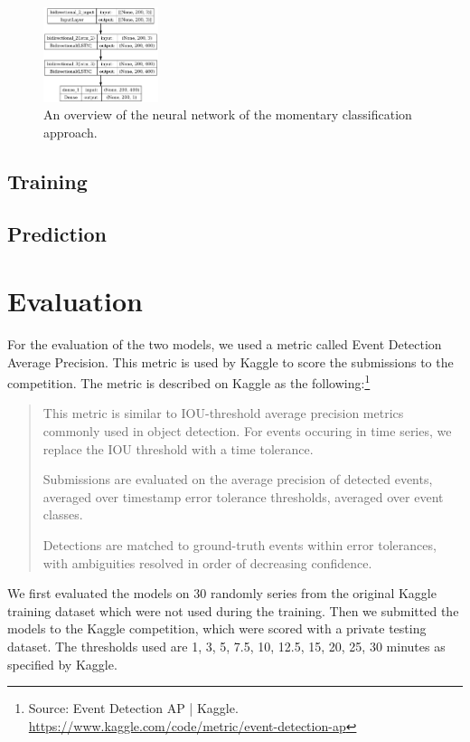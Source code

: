\documentclass{article}
\begin{document}
\begin{figure}
    \label{fig:model-lstm}
    \centering
    \includegraphics[width=0.3\textwidth]{model_plot-2.png}
    \caption{An overview of the neural network of the momentary classification approach.}
\end{figure}

\subsection{Training}

\subsection{Prediction}

\section{Evaluation}

For the evaluation of the two models, we used a metric called Event Detection Average Precision. This metric is used by Kaggle to score the submissions to the competition. The metric is described on Kaggle as the following:\footnote{Source: Event Detection AP | Kaggle. \url{https://www.kaggle.com/code/metric/event-detection-ap}}
\begin{quote}
    This metric is similar to IOU-threshold average precision metrics commonly
    used in object detection. For events occuring in time series, we replace the
    IOU threshold with a time tolerance.

    Submissions are evaluated on the average precision of detected events,
    averaged over timestamp error tolerance thresholds, averaged over event
    classes.

    Detections are matched to ground-truth events within error tolerances, with
    ambiguities resolved in order of decreasing confidence.
\end{quote}

We first evaluated the models on 30 randomly series from the original Kaggle training dataset which were not used during the training. Then we submitted the models to the Kaggle competition, which were scored with a private testing dataset. The thresholds used are 1, 3, 5, 7.5, 10, 12.5, 15, 20, 25, 30 minutes as specified by Kaggle.
\end{document}
